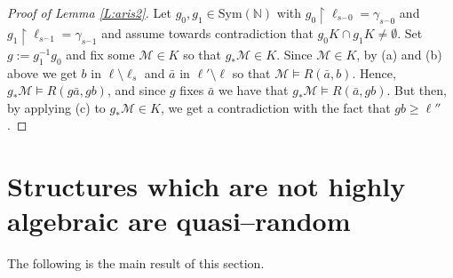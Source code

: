 \documentclass[11pt]{amsart}
\theoremstyle{plain}
\theoremstyle{definition}
\begin{document}
\begin{proof}[Proof of Lemma \ref{L:aris2}]
Let  $g_0,g_1\in \mathrm{Sym}(\mathbb{N})$ with $g_0\upharpoonright \ell_{s^{\frown}0}=\gamma_{s^{\frown}0}$ and $g_1\upharpoonright \ell_{s^{\frown}1}=\gamma_{s^{\frown}1}$ and assume towards contradiction that $g_0K\cap g_1 K\neq\emptyset$. Set $g:=g^{-1}_1g_0$ and fix some $\mathcal{M}\in K$ so that $g_*\mathcal{M}\in K$. Since $\mathcal{M}\in K$, by (a) and (b) above we get $b$ in $\ell\setminus \ell_s$ and $\bar{a}$ in $\ell'\setminus \ell$ so that $\mathcal{M}\models R(\bar{a},b)$. Hence,  $g_*\mathcal{M}\models R(g\bar{a},gb)$, and since $g$ fixes $\bar{a}$ we have that $g_*\mathcal{M}\models R(\bar{a},gb)$. But then, by applying (c) to $g_*\mathcal{M}\in K$,
we get a contradiction with the fact that $gb\geq \ell''$.
\end{proof}





\section{Structures which are not highly algebraic are quasi--random}


The following is the main result of this section.
\end{document}
